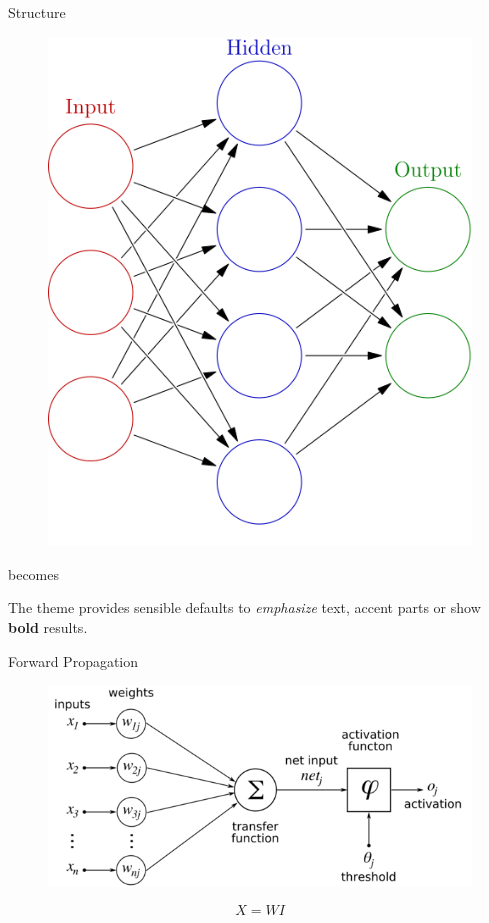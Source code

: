 \documentclass[10pt]{beamer}
\begin{document}
\begin{frame}[fragile]{Structure}
	\begin{figure}
  \includegraphics[scale=0.4]{structure}
	\centering
	\end{figure}
		

  \begin{center}becomes\end{center}

  The theme provides sensible defaults to \emph{emphasize} text,
  \alert{accent} parts or show \textbf{bold} results.
\end{frame}

\begin{frame}{Forward Propagation}
	\begin{figure}
  \includegraphics[scale=0.4]{forwardP}
	\centering
	\end{figure}

	\[X=WI\]
\end{frame}
\end{document}

